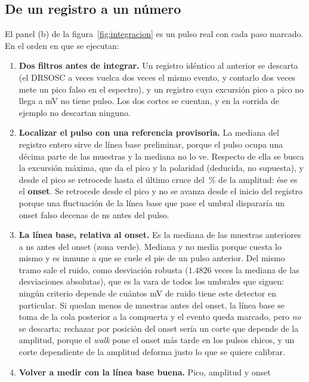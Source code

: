 \documentclass[11pt,a4paper]{article}
\begin{document}
\subsection{De un registro a un número}
\label{sec:area}

El panel (b) de la figura~\ref{fig:integracion} es un pulso real con cada paso
marcado. En el orden en que se ejecutan:

\begin{enumerate}
\item \textbf{Dos filtros antes de integrar.} Un registro idéntico al anterior
      se descarta (el DRSOSC a veces vuelca dos veces el mismo evento, y
      contarlo dos veces mete un pico falso en el espectro), y un registro cuya
      excursión pico a pico no llega a \UmbralRuido{} mV no tiene pulso. Los dos
      cortes se cuentan, y en la corrida de ejemplo no descartan ninguno.
\item \textbf{Localizar el pulso con una referencia provisoria.} La mediana del
      registro entero sirve de línea base preliminar, porque el pulso ocupa una
      décima parte de las muestras y la mediana no lo ve. Respecto de ella se
      busca la excursión máxima, que da el pico y la polaridad (deducida, no
      supuesta), y desde el pico se retrocede hasta el último cruce del
      \FracOnset\,\% de la amplitud: ése es el \textbf{onset}. Se retrocede
      desde el pico y no se avanza desde el inicio del registro porque una
      fluctuación de la línea base que pase el umbral dispararía un onset falso
      decenas de ns antes del pulso.
\item \textbf{La línea base, relativa al onset.} Es la mediana de las muestras
      anteriores a \GuardaBase{} ns antes del onset (zona verde). Mediana y no
      media porque cuesta lo mismo y es inmune a que se cuele el pie de un
      pulso anterior. Del mismo tramo sale el ruido, como desviación robusta
      ($1.4826$ veces la mediana de las desviaciones absolutas), que es la
      vara de todos los umbrales que siguen: ningún criterio depende de cuántos
      mV de ruido tiene este detector en particular. Si quedan menos de
      \MinBase{} muestras antes del onset, la línea base se toma de la cola
      posterior a la compuerta y el evento queda marcado, pero \emph{no} se
      descarta: rechazar por posición del onset sería un corte que depende de la
      amplitud, porque el \emph{walk} pone el onset más tarde en los pulsos
      chicos, y un corte dependiente de la amplitud deforma justo lo que se
      quiere calibrar.
\item \textbf{Volver a medir con la línea base buena.} Pico, amplitud y onset

\end{enumerate}
\end{document}
